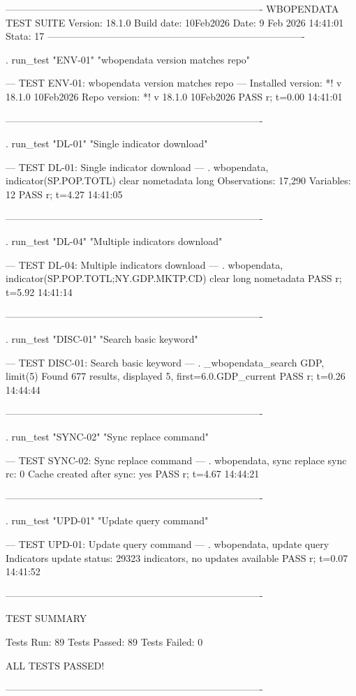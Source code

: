 -------------------------------------------------------------------------------
WBOPENDATA TEST SUITE
Version: 18.1.0
Build date: 10Feb2026
Date:  9 Feb 2026 14:41:01
Stata: 17
-------------------------------------------------------------------------------

. run_test "ENV-01" "wbopendata version matches repo"

--- TEST ENV-01: wbopendata version matches repo ---
Installed version: *! v 18.1.0  10Feb2026
Repo version:      *! v 18.1.0  10Feb2026
PASS
r; t=0.00 14:41:01

-------------------------------------------------------------------------------

. run_test "DL-01" "Single indicator download"

--- TEST DL-01: Single indicator download ---
. wbopendata, indicator(SP.POP.TOTL) clear nometadata long
Observations: 17,290
Variables:    12
PASS
r; t=4.27 14:41:05

-------------------------------------------------------------------------------

. run_test "DL-04" "Multiple indicators download"

--- TEST DL-04: Multiple indicators download ---
. wbopendata, indicator(SP.POP.TOTL;NY.GDP.MKTP.CD) clear long nometadata
PASS
r; t=5.92 14:41:14

-------------------------------------------------------------------------------

. run_test "DISC-01" "Search basic keyword"

--- TEST DISC-01: Search basic keyword ---
. _wbopendata_search GDP, limit(5)
Found 677 results, displayed 5, first=6.0.GDP_current
PASS
r; t=0.26 14:44:44

-------------------------------------------------------------------------------

. run_test "SYNC-02" "Sync replace command"

--- TEST SYNC-02: Sync replace command ---
. wbopendata, sync replace
sync rc: 0
Cache created after sync: yes
PASS
r; t=4.67 14:44:21

-------------------------------------------------------------------------------

. run_test "UPD-01" "Update query command"

--- TEST UPD-01: Update query command ---
. wbopendata, update query
Indicators update status: 29323 indicators, no updates available
PASS
r; t=0.07 14:41:52

-------------------------------------------------------------------------------

TEST SUMMARY

Tests Run:    89
Tests Passed: 89
Tests Failed: 0

ALL TESTS PASSED!

-------------------------------------------------------------------------------
